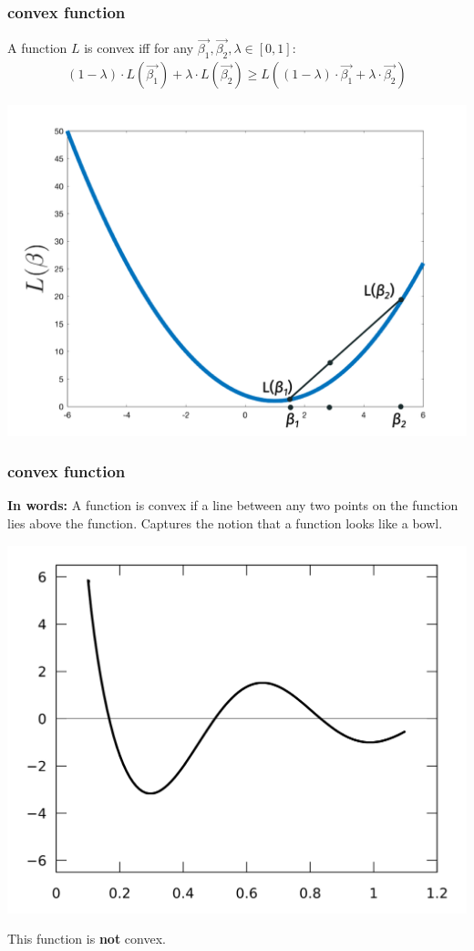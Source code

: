 \documentclass[handout,compress]{beamer}
\begin{document}
\begin{frame}[t]
	\frametitle{convex function}
		\begin{definition}[Convex]
		A function $L$ is convex iff for any $\vec{\beta_1}, \vec{\beta_2},\lambda \in [0,1]$:
		\begin{align*}
		(1-\lambda)\cdot L(\vec{\beta_1}) + \lambda \cdot L(\vec{\beta_2}) \geq L\left((1-\lambda)\cdot\vec{\beta_1}+ \lambda \cdot\vec{\beta_2}\right)
		\end{align*}
		\vspace{-1em}
	\end{definition}
\vspace{-2em}
\begin{center}
	\includegraphics[width=.75\textwidth]{convex.png}
\end{center}
\end{frame}

\begin{frame}
		\frametitle{convex function}
	\textbf{In words:} A function is convex if a line between any two points on the function lies above the function. Captures the notion that a function looks like a bowl.
	
	\begin{center}
				\includegraphics[width=.7\textwidth]{local_min_blank.png}
				
		This function is \textbf{not} convex.
	\end{center} 
	
\end{frame}
\end{document}

